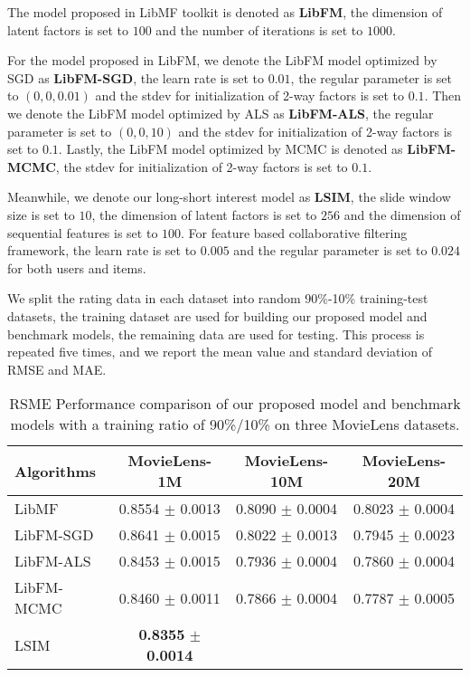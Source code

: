 \documentclass{sig-alternate-05-2015}
\begin{document}
The model proposed in LibMF toolkit is denoted as \textbf{LibFM},
the dimension of latent factors is set to $100$ and the number of
iterations is set to $1000$.

For the model proposed in LibFM, we denote the LibFM model optimized by
SGD as \textbf{LibFM-SGD}, the learn rate is set to $0.01$, the regular
parameter is set to $(0,0,0.01)$ and the stdev for initialization of 2-way
factors is set to $0.1$. Then we denote the LibFM model optimized by ALS
as \textbf{LibFM-ALS}, the regular parameter is set to $(0,0,10)$ and the
stdev for initialization of 2-way factors is set to $0.1$. Lastly, the
LibFM model optimized by MCMC is denoted as \textbf{LibFM-MCMC}, the stdev
for initialization of 2-way factors is set to $0.1$.

Meanwhile, we denote our long-short interest model as \textbf{LSIM},
the slide window size is set to $10$, the dimension of latent factors is
set to $256$ and the dimension of sequential features is set to $100$.
For feature based collaborative filtering framework, the learn rate is set
to $0.005$ and the regular parameter is set to $0.024$ for both users and items.

We split the rating data in each dataset into random 90\%-10\% training-test
datasets, the training dataset are used for building our proposed model
and benchmark models, the remaining data are used for testing.
This process is repeated five times, and we report the mean value and
standard deviation of RMSE and MAE.

\begin{table*}[htpb]
	\centering
	\caption{RSME Performance comparison of our proposed model and benchmark models
    with a training ratio of 90\%/10\% on three MovieLens datasets.}
	\label{tab:msre}
	\begin{tabular}{|l|c|c|c|}
		\hline
		\textbf{Algorithms} & \textbf{MovieLens-1M} & \textbf{MovieLens-10M} & \textbf{MovieLens-20M} \\
		\hline
		LibMF      & 0.8554 $\pm$ 0.0013 & 0.8090 $\pm$ 0.0004 & 0.8023 $\pm$ 0.0004 \\
		LibFM-SGD  & 0.8641 $\pm$ 0.0015 & 0.8022 $\pm$ 0.0013 & 0.7945 $\pm$ 0.0023 \\
		LibFM-ALS  & 0.8453 $\pm$ 0.0015 & 0.7936 $\pm$ 0.0004 & 0.7860 $\pm$ 0.0004 \\
        LibFM-MCMC & 0.8460 $\pm$ 0.0011 & 0.7866 $\pm$ 0.0004 & 0.7787 $\pm$ 0.0005 \\
		LSIM       & \textbf{0.8355} $\pm$ \textbf{0.0014} &  & \\
		\hline
	\end{tabular}
\end{table*}
\end{document}
